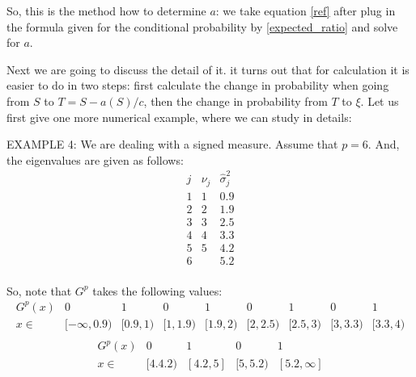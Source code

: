 \documentclass[12pt]{amsart}
\theoremstyle{definition}
\numberwithin{equation}{section}
\numberwithin{equation}{section}
\theoremstyle{remark}
\numberwithin{equation}{section}
\begin{document}
So, this is the method how to determine $a$: we take equation \ref{ref} after plug in the formula given for the conditional probability by \ref{expected_ratio} and solve for $a$.

Next we are going to discuss the detail of it. it turns out that for calculation it is easier to do in two steps: first calculate the change in probability when going from $S$ to $T=S-a(S)/c$, then the change in probability from $T$ to $\xi$. Let us first give one more numerical example, where we can study in details:

EXAMPLE 4: We are dealing with a signed measure.
Assume that $p=6$. And, the  eigenvalues are given as follows:
	$$
	\begin{array}{c|c|c}
	j&\nu_j&\hat{\sigma}^2_j\\\hline
	1&1&0.9\\
	2&2&1.9\\
	3&3&2.5\\
	4&4&3.3\\
	5&5&4.2\\
	6&&5.2\\
	\end{array}$$
	
	So, note that $G^p$ takes the following values:
	$$
	\begin{array}{c||c|c|c|c|c|c|c|c}
	G^p(x)&0&1&0&1&0&1&0&1\\\hline
	x\in&[-\infty,0.9)&[0.9,1)&[1,1.9)&[1.9,2)&[2,2.5)&[2.5,3)&[3,3.3)&[3.3,4)\\
	\end{array}
	$$
	$$
	\begin{array}{c||c|c|c|c}
	G^p(x)&0&1&0&1\\\hline
	x\in&[4.4.2)&[4.2,5]&[5,5.2)&[5.2,\infty]\\
	\end{array}
	$$
	
\end{document}
